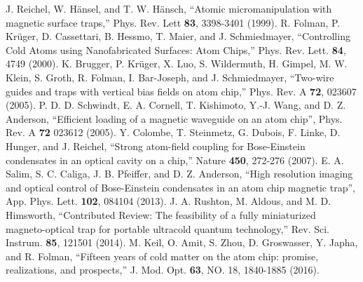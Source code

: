 \documentclass{osa-article}
\begin{document}
\begin{thebibliography}{99}
 J. Reichel, W. H{\"a}nsel, and T. W. H{\"a}nsch, {} ``Atomic micromanipulation with magnetic surface traps,'' Phys. Rev. Lett \textbf{83}, 3398-3401 (1999).
  R. Folman, P. Kr{\"u}ger, D. Cassettari, B. Hessmo, T. Maier, and J. Schmiedmayer, {} ``Controlling Cold Atoms using Nanofabricated Surfaces: Atom Chips,'' Phys. Rev. Lett. \textbf{84}, 4749 (2000).
 K. Brugger, P. Kr{\"u}ger, X. Luo, S. Wildermuth, H. Gimpel, M. W. Klein, S. Groth, R. Folman, I. Bar-Joseph, and J. Schmiedmayer, ``Two-wire guides and traps with vertical bias fields on atom chip,'' Phys. Rev. A \textbf{72}, 023607 (2005).
 P. D. D. Schwindt, E. A. Cornell, T. Kishimoto, Y.-J. Wang, and D. Z. Anderson, {} ``Efficient loading of a magnetic waveguide on an atom chip'', Phys. Rev. A \textbf{72} 023612 (2005).
  Y. Colombe, T. Steinmetz, G. Dubois, F. Linke, D. Hunger, and J. Reichel, {} ``Strong atom-field coupling for Bose-Einstein condensates in an optical cavity on a chip,'' Nature \textbf{450}, 272-276 (2007).
 E. A. Salim, S. C. Caliga, J. B. Pfeiffer, and D. Z. Anderson, {} ``High resolution imaging and optical control of Bose-Einstein condensates in an atom chip magnetic trap'', App. Phys. Lett. \textbf{102}, 084104 (2013).
 J. A. Rushton, M. Aldous, and M. D. Himsworth, {} ``Contributed Review: The feasibility of a fully miniaturized magneto-optical trap for portable ultracold quantum technology,'' Rev. Sci. Instrum. \textbf{85}, 121501 (2014).
 M. Keil, O. Amit, S. Zhou, D. Groswasser, Y. Japha, and R. Folman, {} ``Fifteen years of cold matter on the atom chip: promise, realizations, and prospects,'' J. Mod. Opt. \textbf{63}, NO. 18, 1840-1885 (2016).


\end{thebibliography}
\end{document}
